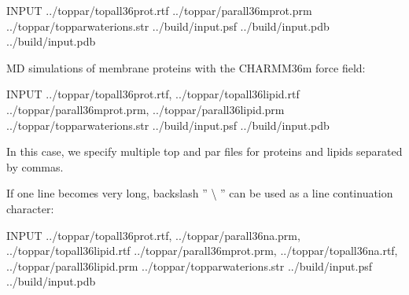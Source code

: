 \documentclass[a4paper,11pt,oneside,english]{sphinxmanual}
\begin{document}
\begin{sphinxVerbatim}[commandchars=\\\{\}]
\PYG{o}{[}INPUT\PYG{o}{]}
  ../toppar/top\PYGZus{}all36\PYGZus{}prot.rtf
  ../toppar/par\PYGZus{}all36m\PYGZus{}prot.prm
  ../toppar/toppar\PYGZus{}water\PYGZus{}ions.str
  ../build/input.psf
  ../build/input.pdb
  ../build/input.pdb
\end{sphinxVerbatim}

MD simulations of membrane proteins with the CHARMM36m force field:

\begin{sphinxVerbatim}[commandchars=\\\{\}]
\PYG{o}{[}INPUT\PYG{o}{]}
  ../toppar/top\PYGZus{}all36\PYGZus{}prot.rtf, ../toppar/top\PYGZus{}all36\PYGZus{}lipid.rtf
  ../toppar/par\PYGZus{}all36m\PYGZus{}prot.prm, ../toppar/par\PYGZus{}all36\PYGZus{}lipid.prm
  ../toppar/toppar\PYGZus{}water\PYGZus{}ions.str
  ../build/input.psf
  ../build/input.pdb
\end{sphinxVerbatim}

In this case, we specify multiple top and par files for proteins and lipids separated by commas.

If one line becomes very long, backslash ” \textbackslash{} ” can be used as a line continuation character:

\begin{sphinxVerbatim}[commandchars=\\\{\}]
\PYG{o}{[}INPUT\PYG{o}{]}
  ../toppar/top\PYGZus{}all36\PYGZus{}prot.rtf, 
          ../toppar/par\PYGZus{}all36\PYGZus{}na.prm,   
          ../toppar/top\PYGZus{}all36\PYGZus{}lipid.rtf
  ../toppar/par\PYGZus{}all36m\PYGZus{}prot.prm, 
          ../toppar/top\PYGZus{}all36\PYGZus{}na.rtf,    
          ../toppar/par\PYGZus{}all36\PYGZus{}lipid.prm
  ../toppar/toppar\PYGZus{}water\PYGZus{}ions.str
  ../build/input.psf
  ../build/input.pdb
\end{sphinxVerbatim}
\end{document}
